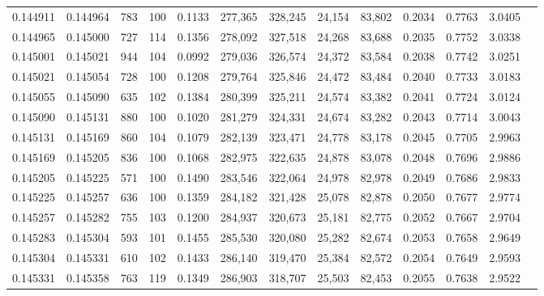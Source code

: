 \begin{tabular}{rrrrrrrrrrrrr}
0.144911 & 0.144964 &   783 & 100 &                                     0.1133 & 277,365 & 328,245 &  24,154 &  83,802 & 0.2034 & 0.7763 & 3.0405 \\
0.144965 & 0.145000 &   727 & 114 &                                     0.1356 & 278,092 & 327,518 &  24,268 &  83,688 & 0.2035 & 0.7752 & 3.0338 \\
0.145001 & 0.145021 &   944 & 104 &                                     0.0992 & 279,036 & 326,574 &  24,372 &  83,584 & 0.2038 & 0.7742 & 3.0251 \\
0.145021 & 0.145054 &   728 & 100 &                                     0.1208 & 279,764 & 325,846 &  24,472 &  83,484 & 0.2040 & 0.7733 & 3.0183 \\
0.145055 & 0.145090 &   635 & 102 &                                     0.1384 & 280,399 & 325,211 &  24,574 &  83,382 & 0.2041 & 0.7724 & 3.0124 \\
0.145090 & 0.145131 &   880 & 100 &                                     0.1020 & 281,279 & 324,331 &  24,674 &  83,282 & 0.2043 & 0.7714 & 3.0043 \\
0.145131 & 0.145169 &   860 & 104 &                                     0.1079 & 282,139 & 323,471 &  24,778 &  83,178 & 0.2045 & 0.7705 & 2.9963 \\
0.145169 & 0.145205 &   836 & 100 &                                     0.1068 & 282,975 & 322,635 &  24,878 &  83,078 & 0.2048 & 0.7696 & 2.9886 \\
0.145205 & 0.145225 &   571 & 100 &                                     0.1490 & 283,546 & 322,064 &  24,978 &  82,978 & 0.2049 & 0.7686 & 2.9833 \\
0.145225 & 0.145257 &   636 & 100 &                                     0.1359 & 284,182 & 321,428 &  25,078 &  82,878 & 0.2050 & 0.7677 & 2.9774 \\
0.145257 & 0.145282 &   755 & 103 &                                     0.1200 & 284,937 & 320,673 &  25,181 &  82,775 & 0.2052 & 0.7667 & 2.9704 \\
0.145283 & 0.145304 &   593 & 101 &                                     0.1455 & 285,530 & 320,080 &  25,282 &  82,674 & 0.2053 & 0.7658 & 2.9649 \\
0.145304 & 0.145331 &   610 & 102 &                                     0.1433 & 286,140 & 319,470 &  25,384 &  82,572 & 0.2054 & 0.7649 & 2.9593 \\
0.145331 & 0.145358 &   763 & 119 &                                     0.1349 & 286,903 & 318,707 &  25,503 &  82,453 & 0.2055 & 0.7638 & 2.9522 \\

\end{tabular}
